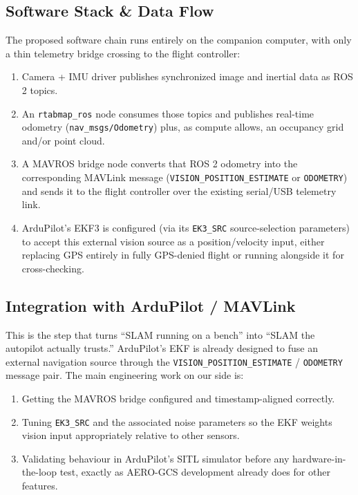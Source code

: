 \documentclass[11pt,a4paper]{article}
\begin{document}
\subsection{Software Stack \& Data Flow}
The proposed software chain runs entirely on the companion computer, with only a thin telemetry bridge crossing to the flight controller:
\begin{enumerate}
    \item Camera + IMU driver publishes synchronized image and inertial data as ROS 2 topics.
    \item An \texttt{rtabmap\_ros} node consumes those topics and publishes real-time odometry (\texttt{nav\_msgs/Odometry}) plus, as compute allows, an occupancy grid and/or point cloud.
    \item A MAVROS bridge node converts that ROS 2 odometry into the corresponding MAVLink message (\texttt{VISION\_POSITION\_ESTIMATE} or \texttt{ODOMETRY}) and sends it to the flight controller over the existing serial/USB telemetry link.
    \item ArduPilot's EKF3 is configured (via its \texttt{EK3\_SRC} source-selection parameters) to accept this external vision source as a position/velocity input, either replacing GPS entirely in fully GPS-denied flight or running alongside it for cross-checking.
\end{enumerate}

\subsection{Integration with ArduPilot / MAVLink}
This is the step that turns ``SLAM running on a bench'' into ``SLAM the autopilot actually trusts.'' ArduPilot's EKF is already designed to fuse an external navigation source through the \texttt{VISION\_POSITION\_ESTIMATE} / \texttt{ODOMETRY} message pair. The main engineering work on our side is:
\begin{enumerate}[label=(\alph*)]
    \item Getting the MAVROS bridge configured and timestamp-aligned correctly.
    \item Tuning \texttt{EK3\_SRC} and the associated noise parameters so the EKF weights vision input appropriately relative to other sensors.
    \item Validating behaviour in ArduPilot's SITL simulator before any hardware-in-the-loop test, exactly as AERO-GCS development already does for other features.
\end{enumerate}
\end{document}
